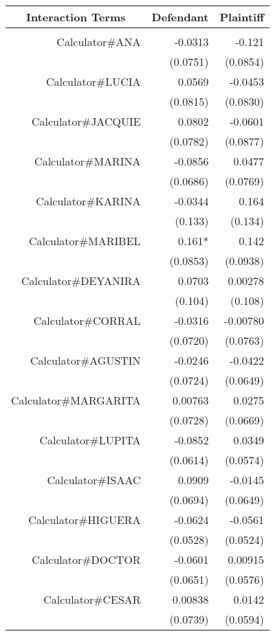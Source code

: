 \begin{tabular}{rrr}
\toprule
\multicolumn{1}{c}{Interaction Terms} & \multicolumn{1}{c}{Defendant} & \multicolumn{1}{c}{Plaintiff } \\
\midrule
      &       &  \\
Calculator\#ANA & -0.0313 & -0.121 \\
      & (0.0751) & (0.0854) \\
Calculator\#LUCIA & 0.0569 & -0.0453 \\
      & (0.0815) & (0.0830) \\
Calculator\#JACQUIE & 0.0802 & -0.0601 \\
      & (0.0782) & (0.0877) \\
Calculator\#MARINA & -0.0856 & 0.0477 \\
      & (0.0686) & (0.0769) \\
Calculator\#KARINA & -0.0344 & 0.164 \\
      & (0.133) & (0.134) \\
Calculator\#MARIBEL & 0.161* & 0.142 \\
      & (0.0853) & (0.0938) \\
Calculator\#DEYANIRA & 0.0703 & 0.00278 \\
      & (0.104) & (0.108) \\
Calculator\#CORRAL & -0.0316 & -0.00780 \\
      & (0.0720) & (0.0763) \\
Calculator\#AGUSTIN & -0.0246 & -0.0422 \\
      & (0.0724) & (0.0649) \\
Calculator\#MARGARITA & 0.00763 & 0.0275 \\
      & (0.0728) & (0.0669) \\
Calculator\#LUPITA & -0.0852 & 0.0349 \\
      & (0.0614) & (0.0574) \\
Calculator\#ISAAC & 0.0909 & -0.0145 \\
      & (0.0694) & (0.0649) \\
Calculator\#HIGUERA & -0.0624 & -0.0561 \\
      & (0.0528) & (0.0524) \\
Calculator\#DOCTOR & -0.0601 & 0.00915 \\
      & (0.0651) & (0.0576) \\
Calculator\#CESAR & 0.00838 & 0.0142 \\
      & (0.0739) & (0.0594) \\
\bottomrule
\end{tabular}%
